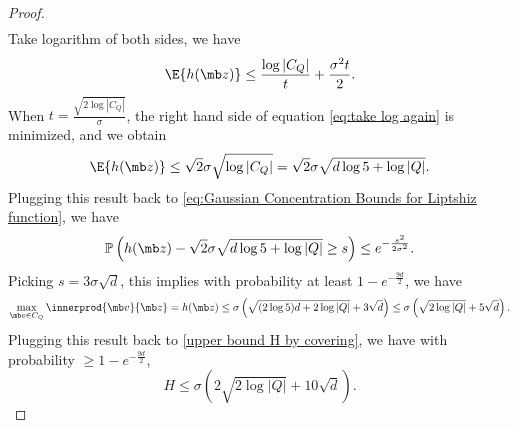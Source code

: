 {\begin{proof}
\begin{equation}
\begin{aligned}
    \end{aligned}
\end{equation}
Take logarithm of both sides, we have
\begin{equation}\label{eq:take log again}
    \E{h(\mb z)}
    \leq \frac{\log|C_Q|}{t} + \frac{ \sigma^2 t}{2}.
\end{equation}
When $t = \frac{\sqrt{2 \log |C_Q|}}{\sigma}$, the right hand side of equation \eqref{eq:take log again} is minimized, and we obtain
\begin{equation}
    \E{h(\mb z)}
     \leq \sqrt{2} \sigma \sqrt{\log |C_Q|} 
     = \sqrt{2} \sigma \sqrt{d\log5 +\log |Q|}.
\end{equation}
Plugging this result back to \ref{eq:Gaussian Concentration Bounds for Liptshiz function}, we have 
\begin{equation}
    \mathbb P\left(h(\mb z) - \sqrt{2} \sigma \sqrt{d\log5 +\log |Q|}  \geq s \right) \leq e^{-\frac{s^2}{2\sigma^2}}.
\end{equation}
Picking $s= 3\sigma\sqrt{d}$, this implies with probability at least $1 - e^{-\frac{9d}{2}}$, we have
\begin{equation}
    \max_{\mb v \in C_Q} \innerprod{\mb v}{\mb z} = h(\mb z) \le \sigma\left(\sqrt{(2\log5)d +2\log |Q|}+3\sqrt{d}\right) \le \sigma\left(\sqrt{2\log|Q|}+5\sqrt{d}\right).
\end{equation}
Plugging this result back to \ref{upper bound H by covering}, we have with probability $\ge 1 - e^{-\frac{9d}{2}}$,
\begin{equation}
H \le  \sigma\left(2\sqrt{2\log|Q|}+10\sqrt{d}\right).
\end{equation}
\end{proof}
}

